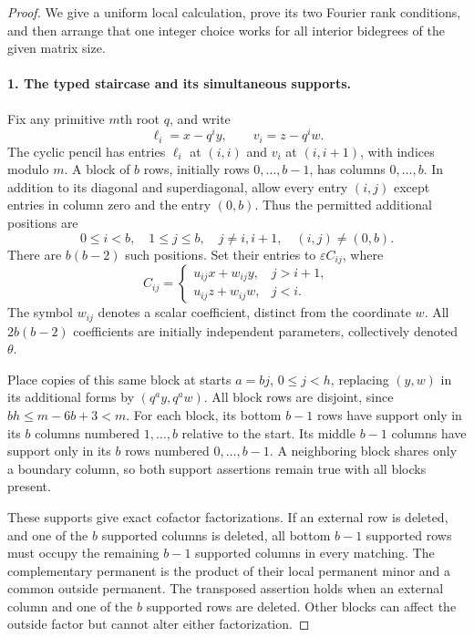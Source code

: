 \begin{proof}
We give a uniform local calculation, prove its two Fourier rank
conditions, and then arrange that one integer choice works for all
interior bidegrees of the given matrix size.

\paragraph{1. The typed staircase and its simultaneous supports.}
Fix any primitive $m$th root $q$, and write
\[
 \ell_i=x-q^iy,\qquad v_i=z-q^iw.
\]
The cyclic pencil has entries $\ell_i$ at $(i,i)$ and $v_i$ at
$(i,i+1)$, with indices modulo $m$.
A block of $b$ rows, initially rows $0,\ldots,b-1$, has columns
$0,\ldots,b$. In addition to its diagonal and superdiagonal, allow
every entry $(i,j)$ except entries in column zero and the entry
$(0,b)$. Thus the permitted additional positions are
\[
 0\leq i<b,\quad1\leq j\leq b,\quad
 j\ne i,i+1,\quad(i,j)\ne(0,b).
\]
There are $b(b-2)$ such positions. Set their entries to
$\varepsilon C_{ij}$, where
\begin{equation}\label{R22:types}
 C_{ij}=\begin{cases}
 u_{ij}x+w_{ij}y,&j>i+1,\\
 u_{ij}z+w_{ij}w,&j<i.
 \end{cases}
\end{equation}
The symbol $w_{ij}$ denotes a scalar coefficient, distinct from the
coordinate $w$. All $2b(b-2)$ coefficients are initially independent
parameters, collectively denoted $\theta$.

Place copies of this same block at starts $a=bj$, $0\leq j<h$,
replacing $(y,w)$ in its additional forms by $(q^ay,q^aw)$.
All block rows are disjoint, since $bh\leq m-6b+3<m$.
For each block, its bottom $b-1$ rows have support only in its
$b$ columns numbered $1,\ldots,b$ relative to the start.
Its middle $b-1$ columns have support only in its $b$ rows numbered
$0,\ldots,b-1$. A neighboring block shares only a boundary column,
so both support assertions remain true with all blocks present.

These supports give exact cofactor factorizations. If an external row
is deleted, and one of the $b$ supported columns is deleted, all
bottom $b-1$ supported rows must occupy the remaining $b-1$ supported
columns in every matching. The complementary permanent is the product
of their local permanent minor and a common outside permanent.
The transposed assertion holds when an external column and one of
the $b$ supported rows are deleted. Other blocks can affect the outside
factor but cannot alter either factorization.


\end{proof}

